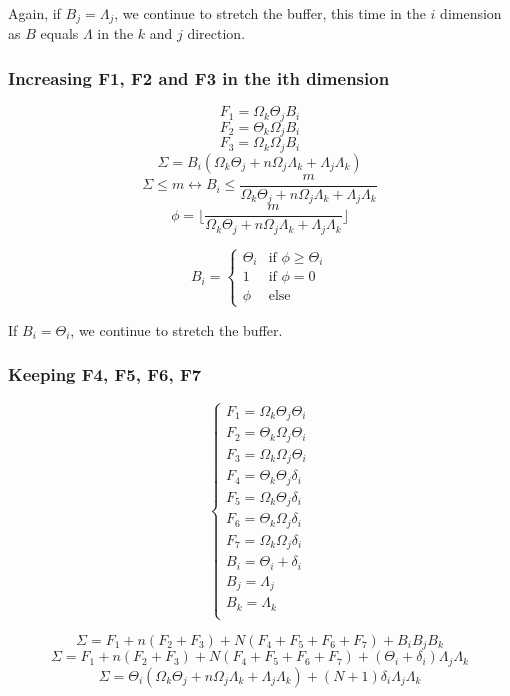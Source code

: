 \documentclass[conference]{IEEEtran}
\begin{document}
Again, if $B_j=\Lambda_j$, we continue to stretch the buffer, this time in the
$i$ dimension as $B$ equals $\Lambda$ in the $k$ and $j$ direction.

\subsubsection{Increasing F1, F2 and F3 in the ith dimension}
$$F_1 = \Omega_k\Theta_jB_i$$
$$F_2 = \Theta_k\Omega_jB_i$$
$$F_3 = \Omega_k\Omega_jB_i$$
$$\Sigma = B_i(\Omega_k\Theta_j + n\Omega_j\Lambda_k + \Lambda_j\Lambda_k)$$
$$\Sigma \leq m \leftrightarrow B_i \leq \frac{m}{\Omega_k\Theta_j + n\Omega_j\Lambda_k + \Lambda_j\Lambda_k}$$
$$\phi = \lfloor \frac{m}{\Omega_k\Theta_j + n\Omega_j\Lambda_k + \Lambda_j\Lambda_k} \rfloor$$

$$B_i = \begin{cases}
  \Theta_i & \textrm{if }\phi \geq \Theta_i \\
  1 & \textrm{if }\phi = 0 \\
  \phi & \textrm{else}
\end{cases}$$

If $B_i=\Theta_i$, we continue to stretch the buffer.

\subsubsection{Keeping F4, F5, F6, F7}

$$\begin{cases}
  F_1 = \Omega_k\Theta_j\Theta_i \\
  F_2 = \Theta_k\Omega_j\Theta_i \\
  F_3 = \Omega_k\Omega_j\Theta_i \\
  F_4 = \Theta_k\Theta_j\delta_i \\
  F_5 = \Omega_k\Theta_j\delta_i \\
  F_6 = \Theta_k\Omega_j\delta_i \\
  F_7 = \Omega_k\Omega_j\delta_i \\
  B_i = \Theta_i + \delta_i \\
  B_j = \Lambda_j\\
  B_k = \Lambda_k\\
\end{cases}$$

$$\Sigma = F_1 + n(F_2 + F_3) + N(F_4 + F_5 + F_6 + F_7) + B_iB_jB_k$$
$$\Sigma = F_1 + n(F_2 + F_3) + N(F_4 + F_5 + F_6 + F_7) + (\Theta_i + \delta_i)\Lambda_j\Lambda_k$$
$$\Sigma = \Theta_i(\Omega_k\Theta_j + n\Omega_j\Lambda_k + \Lambda_j\Lambda_k) + (N+1)\delta_i\Lambda_j\Lambda_k$$
\end{document}
